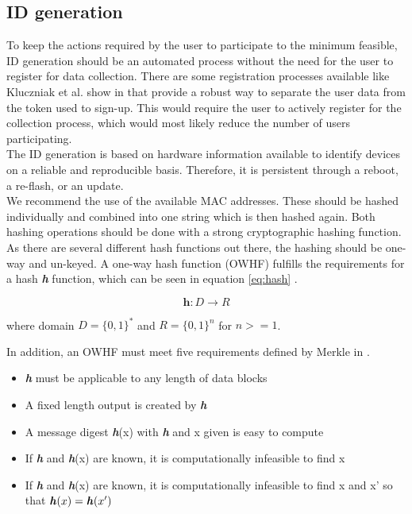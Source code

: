           
    \subsection{ID generation}
        \label{subsec:software_design:id}
        To keep the actions required by the user to participate to the minimum feasible, ID generation should be an automated process without the need for the user to register for data collection. There are some registration processes available like Kluczniak et al. show in  \cite{kluczniak_anonymous_2015} that provide a robust way to separate the user data from the token used to sign-up. This would require the user to actively register for the collection process, which would most likely reduce the number of users participating.\\
        
        The ID generation is based on hardware information available to identify devices on a reliable and reproducible basis. Therefore, it is persistent through a reboot, a re-flash, or an update.\\
        We recommend the use of the available MAC addresses. These should be hashed individually and combined into one string which is then hashed again. Both hashing operations should be done with a strong cryptographic hashing function.
        As there are several different hash functions out there, the hashing should be one-way and un-keyed. A one-way hash function (OWHF) fulfills the requirements for a hash \textbf{\textit{h}} function, which can be seen in equation \ref{eq:hash} \cite{sobti_cryptographic_2012}.
        
        \begin{equation}
            \label{eq:hash}
            \textbf{h} : D \longrightarrow R
        \end{equation}
        
        where domain $D = \{0,1\}^*$ and $R=\{0,1\}^n$ for $n >= 1$.
        
        In addition, an OWHF must meet five requirements defined by Merkle in  \cite{merkle_secrecy_1979}.
        \begin{itemize}
            \item \textbf{\textit{h}} must be applicable to any length of data blocks
            \item A fixed length output is created by \textbf{\textit{h}}
            \item A message digest \textbf{\textit{h}}(x) with \textbf{\textit{h}} and x given is easy to compute
            \item If \textbf{\textit{h}} and \textbf{\textit{h}}(x) are known, it is computationally infeasible to find x
            \item If \textbf{\textit{h}} and \textbf{\textit{h}}(x) are known, it is computationally infeasible to find x and x' so that $\textbf{\textit{h}}(x) = \textbf{\textit{h}}(x')$
        \end{itemize}
        
